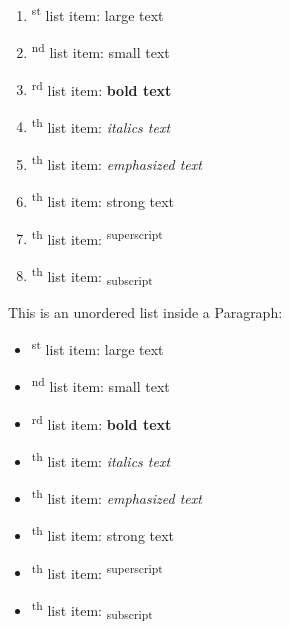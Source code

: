 \begin{paragraph}

    \begin{enumerate}

        \item{}\textsuperscript{st} list item: {\Large large text}
        \item{}\textsuperscript{nd} list item: {\scriptsize small text}
        \item{}\textsuperscript{rd} list item: \textbf{bold text}
        \item{}\textsuperscript{th} list item: \textit{italics text}
        \item{}\textsuperscript{th} list item: \emph{emphasized text}
        \item{}\textsuperscript{th} list item: \textmd{strong text}
        \item{}\textsuperscript{th} list item: \textsuperscript{superscript}
        \item{}\textsuperscript{th} list item: \textsubscript{subscript}
    \end{enumerate}

\end{paragraph}
\begin{paragraph}
This is an unordered list inside a Paragraph:\end{paragraph}
\begin{paragraph}

    \begin{itemize}

        \item{}\textsuperscript{st} list item: {\Large large text}
        \item{}\textsuperscript{nd} list item: {\scriptsize small text}
        \item{}\textsuperscript{rd} list item: \textbf{bold text}
        \item{}\textsuperscript{th} list item: \textit{italics text}
        \item{}\textsuperscript{th} list item: \emph{emphasized text}
        \item{}\textsuperscript{th} list item: \textmd{strong text}
        \item{}\textsuperscript{th} list item: \textsuperscript{superscript}
        \item{}\textsuperscript{th} list item: \textsubscript{subscript}
    \end{itemize}

\end{paragraph}
